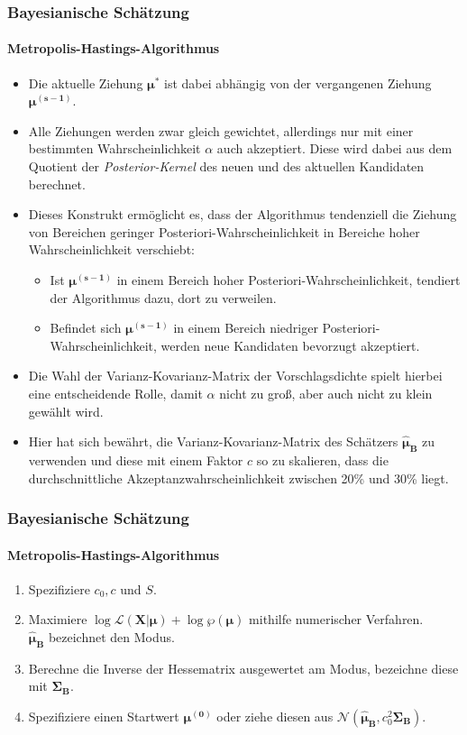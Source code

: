 \documentclass{beamer} %
\newcounter{saveenumi}
\newcommand{\seti}{\setcounter{saveenumi}{\value{enumi}}}
\begin{document}
\begin{frame}\frametitle{Bayesianische Sch\"{a}tzung}\framesubtitle{Metropolis-Hastings-Algorithmus}
\begin{itemize}
  \item Die aktuelle Ziehung $\boldsymbol{\mu^*}$ ist dabei abh\"{a}ngig von der vergangenen Ziehung $\boldsymbol{\mu^{(s-1)}}$.
  \item Alle Ziehungen werden zwar gleich gewichtet, allerdings nur mit einer bestimmten Wahrscheinlichkeit $\alpha$ auch akzeptiert. Diese wird dabei aus dem Quotient der \emph{Posterior-Kernel} des neuen und des aktuellen Kandidaten berechnet.
  \item Dieses Konstrukt erm\"{o}glicht es, dass der Algorithmus tendenziell die Ziehung von Bereichen geringer Posteriori-Wahrscheinlichkeit in Bereiche hoher Wahrscheinlichkeit verschiebt:
  \begin{itemize}
    \item Ist $\boldsymbol{\mu^{(s-1)}}$ in einem Bereich hoher Posteriori-Wahrscheinlichkeit, tendiert der Algorithmus dazu,
dort zu verweilen.
    \item Befindet sich $\boldsymbol{\mu^{(s-1)}}$ in einem Bereich niedriger Posteriori-Wahrscheinlichkeit, werden neue Kandidaten bevorzugt
akzeptiert.
  \end{itemize}
\item Die Wahl der Varianz-Kovarianz-Matrix der Vorschlagsdichte spielt hierbei eine entscheidende Rolle, damit $\alpha$ nicht zu gro{\ss}, aber auch
nicht zu klein gew\"{a}hlt wird.
\item Hier hat sich bew\"{a}hrt, die Varianz-Kovarianz-Matrix des Sch\"{a}tzers $\boldsymbol{\widehat{\mu}_B}$ zu verwenden und diese mit einem Faktor $c$ so zu skalieren, dass die durchschnittliche Akzeptanzwahrscheinlichkeit zwischen 20\% und 30\% liegt.
\end{itemize}

\end{frame}

\begin{frame}\frametitle{Bayesianische Sch\"{a}tzung}\framesubtitle{Metropolis-Hastings-Algorithmus}
\begin{enumerate}
\item Spezifiziere $c_0,c$ und $S$.
  \item Maximiere $\log{\mathcal{L}(\mathbf{X}|\boldsymbol{\mu})} +
      \log{\wp(\boldsymbol{\mu})}$ mithilfe numerischer Verfahren.\\
      $\boldsymbol{\widehat{\mu}_B}$ bezeichnet den Modus.
  \item Berechne die Inverse der Hessematrix ausgewertet am Modus,
      bezeichne diese mit $\boldsymbol{\Sigma_B}$.
  \item Spezifiziere einen Startwert $\boldsymbol{\mu^{(0)}}$ oder ziehe
      diesen aus
      $\mathcal{N}(\boldsymbol{\widehat{\mu}_B},c_0^2\boldsymbol{\Sigma_B})$.
\seti
\end{enumerate}

\end{frame}
\end{document}
